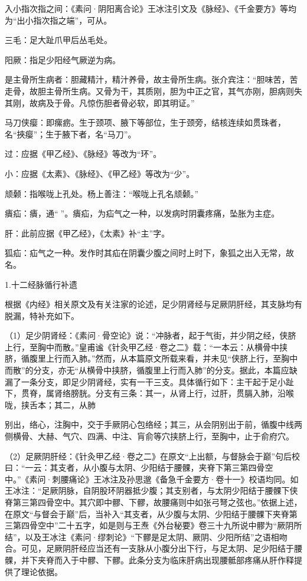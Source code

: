 \documentclass[12pt]{ctexbook}%
\begin{document}

\begin{jiaozhu}
  \item 入小指次指之间：《素问·阴阳离合论》王冰注引文及《脉经》、《千金要方》等均为“出小指次指之端”，可从。
  \item 三毛：足大趾爪甲后丛毛处。
  \item 阳厥：指足少阳经气厥逆为病。
  \item 是主骨所生病者：胆藏精汁，精汁养骨，故主骨所生病。张介宾注：“胆味苦，苦走骨，故胆主骨所生病。又骨为干，其质刚，胆为中正之官，其气亦刚，胆病则失其刚，故病及于骨。凡惊伤胆者骨必软，即其明证。”
  \item 马刀侠瘿：即瘰疬。生于颈项、腋下等部位，生于颈旁，结核连续如贯珠者，名“挾瘿”；生于腋下者，名“马刀”。
  \item 过：应据《甲乙经》、《脉经》等改为“环”。
  \item 小：应据《太素》、《脉经》、《甲乙经》等改为“少”。
  \item 颃颡：指喉咙上孔处。杨上善注：“喉咙上孔名颃颡。”
  \item 㿉疝：㿉，通“𤻊”。㿉疝，为疝气之一种，以发病时阴囊疼痛，坠胀为主症。
  \item 肝：此前应据《甲乙经》，《太素》补“主”字。
  \item 狐疝：疝气之一种。发作时其疝在阴囊少腹之间时上时下，象狐之出入无常，故名。
\end{jiaozhu}


1.十二经脉循行补遗

根据《内经》相关原文及有关注家的论述，足少阴肾经与足厥阴肝经，其支脉均有脱漏，特补充如下。

（1）足少阴肾经：《素问·骨空论》说：“冲脉者，起于气街，并少阴之经，侠脐上行，至胸中而散。”皇甫谧《针灸甲乙经·卷之二》载：“一本云：从横骨中挟脐，循腹里上行而入肺。”然而，从本篇原文所载来看，并未见“侠脐上行，至胸中而散”的分支，亦无“从横骨中挟脐，循腹里上行而入肺”的分支。据此，本篇应缺漏了一条分支，即足少阴肾经，实有一干三支。具体循行如下：主干起于足小趾下，贯脊，属肾络膀胱。分支有三条：其一，从肾上行，过肝，贯膈入肺，沿喉咙，挟舌本；其二，从肺

别出，络心，注胸中，交于手厥阴心包络经；其三，从会阴别出于前，循腹中线两侧横骨、大赫、气穴、四满、中注、肓俞等穴挟脐上行，至胸中，止于俞府穴。

（2）足厥阴肝经：《针灸甲乙经·卷之二》在原文“上出额，与督脉会于巅”句后校曰：“一云：其支者，从小腹与太阴、少阳结于腰髁，夹脊下第三第四骨空中。”《素问·刺腰痛论》王冰注及孙思邈《备急千金要方·卷十一》校语均同。如王冰注：“足厥阴脉，自阴股环阴器抵少腹；其支别者，与太阴少阳结于腰髁下侠脊第三第四骨空中。其穴即中髎、下髎，故腰痛则中如张弓弩之弦也。”依据上述，在原文“与督会于巅”后，当补入“其支者，从少腹与太阴、少阳结于腰髁下夹脊第三第四骨空中”二十五字，如是则与王焘《外台秘要》卷三十九所说中髎为“厥阴所结”，以及王冰注《素问·缪刺论》“下髎是足太阴、厥阴、少阳所结”之语相吻合。可见，足厥阴肝经应当还有一支脉从小腹分出下行，与足太阴、足少阳结于腰髁，并下夹脊而入于中髎、下髎。此条分支为临床肝病出现腰骶部疼痛从肝作释提供了理论依据。
\end{document}
